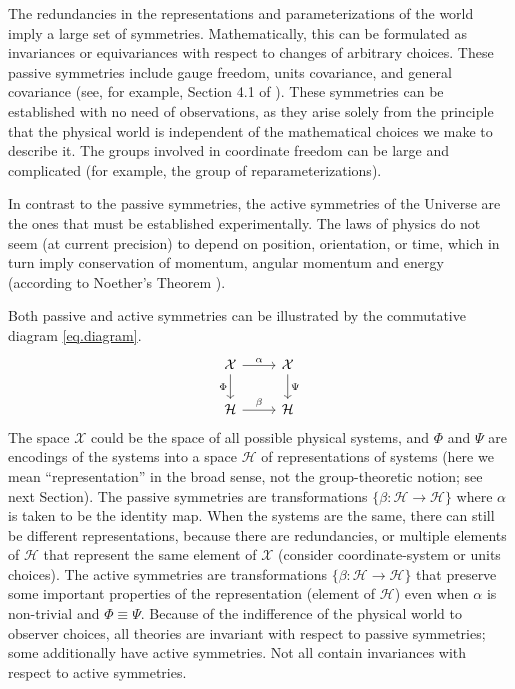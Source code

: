 \documentclass[11pt]{article}
\begin{document}
The redundancies in the representations and parameterizations of the world imply a large set of symmetries.
Mathematically, this can be formulated as invariances or equivariances with respect to changes of arbitrary choices.
These passive symmetries include gauge freedom, units covariance, and general covariance (see, for example, Section 4.1 of \cite{rovelli2000loop}).
These symmetries can be established with no need of observations, as they arise solely from the principle that the physical world is independent of the mathematical choices we make to describe it.
The groups involved in coordinate freedom can be large and complicated (for example, the group of reparameterizations).

In contrast to the passive symmetries, the active symmetries of the Universe are the ones that must be established experimentally.
The laws of physics do not seem (at current precision) to depend on position, orientation, or time, which in turn imply conservation of momentum, angular momentum and energy (according to Noether's Theorem \cite{noether}).

Both passive and active symmetries can be illustrated by the commutative diagram \eqref{eq.diagram}. 
\begin{equation}\label{eq.diagram}
\begin{tikzcd}[]
  {\cal X}\arrow[r,"\alpha"] \arrow[d,"\Phi",swap] & {\cal X}  \arrow[d,"\Psi"]\\
{\cal H} \arrow[r,"\beta"]  & {\cal H} 
\end{tikzcd}
\end{equation}
The space $\mathcal X$ could be the space of all possible physical systems, and $\Phi$ and $\Psi$ are encodings of the systems into a space $\mathcal H$ of representations of systems (here we mean ``representation'' in the broad sense, not the group-theoretic notion; see next Section).
The passive symmetries are transformations $\{\beta:\mathcal H \to \mathcal H\}$ where $\alpha$ is taken to be the identity map.
When the systems are the same, there can still be different representations, because there are redundancies, or multiple elements of $\mathcal H$ that represent the same element of $\mathcal X$ (consider coordinate-system or units choices).
The active symmetries are transformations $\{\beta:\mathcal H \to \mathcal H\}$ that preserve some important properties of the representation (element of $\mathcal H$) even when $\alpha$ is non-trivial and $\Phi\equiv \Psi$.
Because of the indifference of the physical world to observer choices, all theories are invariant with respect to passive symmetries; some additionally have active symmetries.
Not all contain invariances with respect to active symmetries. 
\end{document}
